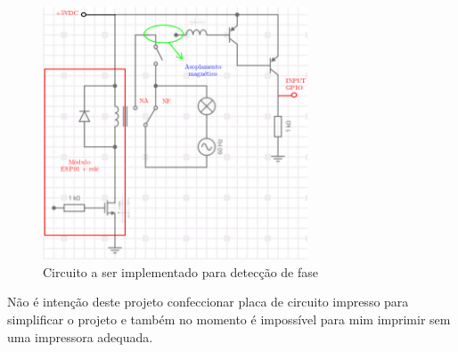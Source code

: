 \documentclass[11pt]{article}
\begin{document}
\begin{figure}[h!]
\caption{\label{fig:tomada}Circuito a ser implementado para detecção de fase}
\centering
\includegraphics[width=0.7\textwidth]{./tomada.png}
\end{figure}

Não é intenção deste projeto confeccionar placa de circuito impresso para simplificar o projeto e também no momento é impossível para mim imprimir sem uma impressora adequada.
\end{document}
